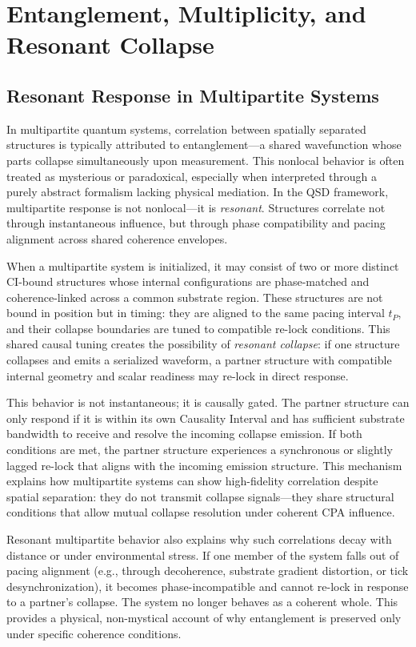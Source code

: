 \documentclass[preprints,article,submit,pdftex,moreauthors]{Definitions/mdpi}
\begin{document}
\section{Entanglement, Multiplicity, and Resonant Collapse}

\subsection{Resonant Response in Multipartite Systems}

In multipartite quantum systems, correlation between spatially separated structures is typically attributed to entanglement—a shared wavefunction whose parts collapse simultaneously upon measurement. This nonlocal behavior is often treated as mysterious or paradoxical, especially when interpreted through a purely abstract formalism lacking physical mediation. In the QSD framework, multipartite response is not nonlocal—it is \emph{resonant}. Structures correlate not through instantaneous influence, but through phase compatibility and pacing alignment across shared coherence envelopes.

When a multipartite system is initialized, it may consist of two or more distinct CI-bound structures whose internal configurations are phase-matched and coherence-linked across a common substrate region. These structures are not bound in position but in timing: they are aligned to the same pacing interval \(t_P\), and their collapse boundaries are tuned to compatible re-lock conditions. This shared causal tuning creates the possibility of \emph{resonant collapse}: if one structure collapses and emits a serialized waveform, a partner structure with compatible internal geometry and scalar readiness may re-lock in direct response.

This behavior is not instantaneous; it is causally gated. The partner structure can only respond if it is within its own Causality Interval and has sufficient substrate bandwidth to receive and resolve the incoming collapse emission. If both conditions are met, the partner structure experiences a synchronous or slightly lagged re-lock that aligns with the incoming emission structure. This mechanism explains how multipartite systems can show high-fidelity correlation despite spatial separation: they do not transmit collapse signals—they share structural conditions that allow mutual collapse resolution under coherent CPA influence.

Resonant multipartite behavior also explains why such correlations decay with distance or under environmental stress. If one member of the system falls out of pacing alignment (e.g., through decoherence, substrate gradient distortion, or tick desynchronization), it becomes phase-incompatible and cannot re-lock in response to a partner’s collapse. The system no longer behaves as a coherent whole. This provides a physical, non-mystical account of why entanglement is preserved only under specific coherence conditions.
\end{document}
